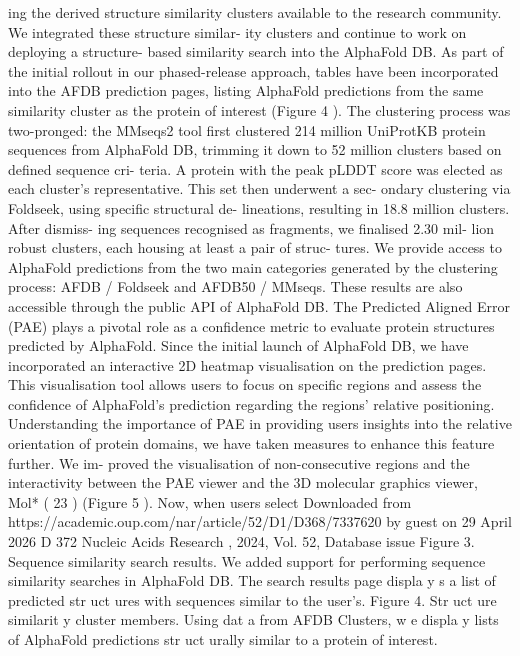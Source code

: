 ing the derived structure similarity clusters available to the
research community. We integrated these structure similar-
ity clusters and continue to work on deploying a structure-
based similarity search into the AlphaFold DB. As part of
the initial rollout in our phased-release approach, tables have
been incorporated into the AFDB prediction pages, listing
AlphaFold predictions from the same similarity cluster as
the protein of interest (Figure 4 ). The clustering process was
two-pronged: the MMseqs2 tool first clustered 214 million
UniProtKB protein sequences from AlphaFold DB, trimming
it down to 52 million clusters based on defined sequence cri-
teria. A protein with the peak pLDDT score was elected as
each cluster’s representative. This set then underwent a sec-
ondary clustering via Foldseek, using specific structural de-
lineations, resulting in 18.8 million clusters. After dismiss-
ing sequences recognised as fragments, we finalised 2.30 mil-
lion robust clusters, each housing at least a pair of struc-
tures. We provide access to AlphaFold predictions from the
two main categories generated by the clustering process:
AFDB / Foldseek and AFDB50 / MMseqs. These results are also
accessible through the public API of AlphaFold DB.
The Predicted Aligned Error (PAE) plays a pivotal role as a
confidence metric to evaluate protein structures predicted by
AlphaFold. Since the initial launch of AlphaFold DB, we have
incorporated an interactive 2D heatmap visualisation on the
prediction pages. This visualisation tool allows users to focus
on specific regions and assess the confidence of AlphaFold’s
prediction regarding the regions’ relative positioning.
Understanding the importance of PAE in providing users
insights into the relative orientation of protein domains, we
have taken measures to enhance this feature further. We im-
proved the visualisation of non-consecutive regions and the
interactivity between the PAE viewer and the 3D molecular
graphics viewer, Mol* ( 23 ) (Figure 5 ). Now, when users select
Downloaded from https://academic.oup.com/nar/article/52/D1/D368/7337620 by guest on 29 April 2026
D 372
Nucleic Acids Research , 2024, Vol. 52, Database issue
Figure 3. Sequence similarity search results. We added support for performing sequence similarity searches in AlphaFold DB. The search results page
displa y s a list of predicted str uct ures with sequences similar to the user’s.
Figure 4. Str uct ure similarit y cluster members. Using dat a from AFDB Clusters, w e displa y lists of AlphaFold predictions str uct urally similar to a protein
of interest.
